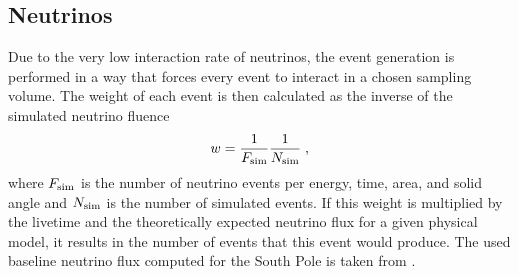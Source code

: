 \subsection{Neutrinos}

Due to the very low interaction rate of neutrinos, the event generation is performed in a way that forces every event to interact in a chosen sampling volume. The weight of each event is then calculated as the inverse of the simulated neutrino fluence
\begin{equation}
    w = \frac{1}{F_{\mathrm{sim}}} \frac{1}{N_{\mathrm{sim}}}
    \;,
    \labeq{neutrino_generation_weight}
\end{equation}
where $F_{\rm{sim}}$ is the number of neutrino events per energy, time, area, and solid angle and $N_{\rm{sim}}$ is the number of simulated events. If this weight is multiplied by the livetime and the theoretically expected neutrino flux for a given physical model, it results in the number of events that this event would produce. The used baseline neutrino flux computed for the South Pole is taken from .

